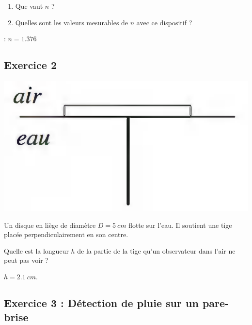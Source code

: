 \begin{enumerate}
	\item Que vaut $n$ ?
	\item Quelles sont les valeurs mesurables de $n$ avec ce dispositif ?
\end{enumerate}

 : $n = 1.376$

\subsection{Exercice 2}

\begin{minipage}[c]{\linewidth/2}
	\includegraphics[width=\linewidth]{Images/mpsi_s04_ex02.png}
\end{minipage}%
\begin{minipage}[c]{\linewidth/2}
	Un disque en liège de diamètre $D = \SI{5}{cm}$ flotte sur l'eau. Il soutient une tige placée perpendiculairement en son centre. 
	
	Quelle est la longueur $h$ de la partie de la tige qu'un observateur dans l'air ne peut pas voir ?
\end{minipage}

 $h = \SI{2.1}{cm}$.

\subsection{Exercice 3 : Détection de pluie sur un pare-brise}

